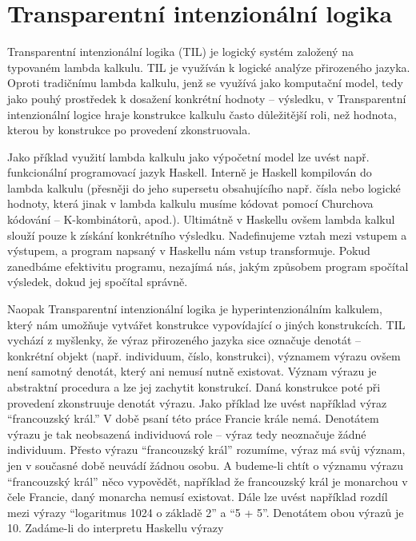 \chapter{Transparentní intenzionální logika}
\label{sec:TILIntroduction}

Transparentní intenzionální logika (TIL) je logický systém založený na typovaném lambda kalkulu.
TIL je využíván k logické analýze přirozeného jazyka. Oproti tradičnímu lambda kalkulu, jenž
se využívá jako komputační model, tedy jako pouhý prostředek k dosažení konkrétní hodnoty --
výsledku, v Transparentní intenzionální logice hraje konstrukce kalkulu často důležitější roli,
než hodnota, kterou by konstrukce po provedení zkonstruovala.

Jako příklad využití lambda kalkulu jako výpočetní model lze uvést např. funkcionální programovací
jazyk Haskell. Interně je Haskell kompilován do lambda kalkulu (přesněji do jeho supersetu
obsahujícího např. čísla nebo logické hodnoty, která jinak v lambda kalkulu musíme kódovat pomocí
Churchova kódování -- K-kombinátorů, apod.). Ultimátně v Haskellu ovšem lambda kalkul slouží pouze
k získání konkrétního výsledku. Nadefinujeme vztah mezi vstupem a výstupem, a program napsaný
v Haskellu nám vstup transformuje. Pokud zanedbáme efektivitu programu, nezajímá nás, jakým
způsobem program spočítal výsledek, dokud jej spočítal správně.

Naopak Transparentní intenzionální logika je hyperintenzionálním kalkulem, který nám umožňuje
vytvářet konstrukce vypovídající o jiných konstrukcích. TIL vychází z myšlenky, že výraz
přirozeného jazyka sice označuje denotát -- konkrétní objekt (např. individuum, číslo, konstrukci),
významem výrazu ovšem není samotný denotát, který ani nemusí nutně existovat. Význam výrazu je
abstraktní procedura a lze jej zachytit konstrukcí. Daná konstrukce poté při provedení zkonstruuje
denotát výrazu. Jako příklad lze uvést například výraz ``francouzský král.'' V době psaní této práce
Francie krále nemá. Denotátem výrazu je tak neobsazená individuová role -- výraz tedy neoznačuje
žádné individuum. Přesto výrazu ``francouzský král'' rozumíme, výraz má svůj význam, jen v současné době neuvádí žádnou osobu.
A budeme-li chtít o významu výrazu ``francouzský král'' něco vypovědět, například že francouzský král
je monarchou v čele Francie, daný monarcha nemusí existovat. Dále lze uvést například rozdíl mezi
výrazy ``logaritmus 1024 o základě 2'' a ``5 + 5''. Denotátem obou výrazů je 10. Zadáme-li do
interpretu Haskellu výrazy

